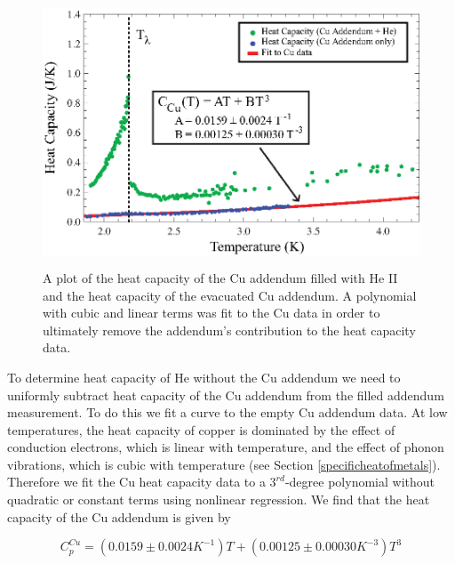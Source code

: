 \begin{figure}[htbp]
\begin{center}
\includegraphics[height=80mm]{./figures/lambdanorm.eps}
\caption{\small{A plot of the heat capacity of the Cu addendum filled with He II and the heat capacity of the evacuated Cu addendum.  A polynomial with cubic and linear terms was fit to the Cu data in order to ultimately remove the addendum's contribution to the heat capacity data.}}
\label{fig:lambdanorm}
\end{center}
\end{figure}

To determine heat capacity of He without the Cu addendum we need to uniformly subtract heat capacity of the Cu addendum from the filled addendum measurement.  To do this we fit a curve to the empty Cu addendum data.  At low temperatures, the heat capacity of copper is dominated by the effect of conduction electrons, which is linear with temperature, and the effect of phonon vibrations, which is cubic with temperature (see Section \ref{specificheatofmetals}).  Therefore we fit the Cu heat capacity data to a $3^{rd}$-degree polynomial without  quadratic or constant terms using nonlinear regression.  We find that the heat capacity of the Cu addendum is given by

\begin{center}
\begin{equation}\label{eq:cufit}
C^{Cu}_{p} =( 0.0159\pm0.0024 K^{-1}) T + (0.00125\pm0.00030 K^{-3}) T^{3} 
\end{equation}
\end{center}

